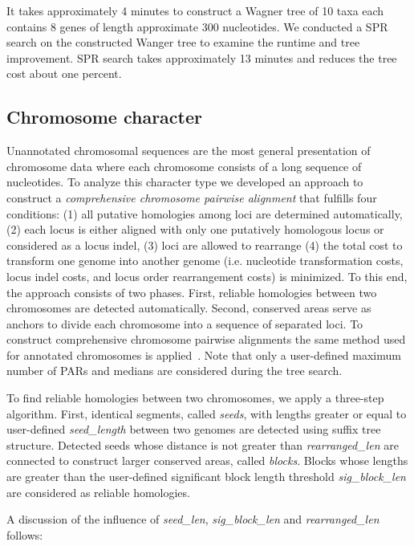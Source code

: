 It takes approximately 4 minutes to construct a Wagner tree of 10 taxa each contains
8 genes of length approximate 300 nucleotides. We conducted a 
SPR search on the constructed Wanger tree to examine the runtime and tree
improvement. SPR search takes approximately 13 minutes and reduces 
the tree cost about one percent.



\subsection{Chromosome character}

Unannotated chromosomal sequences are the most general presentation of
chromosome data where each chromosome consists of a long sequence of nucleotides.
To analyze this character type we developed an approach to construct a \emph{comprehensive chromosome pairwise
 alignment} that fulfills four conditions:
(1) all putative homologies among loci are determined automatically, 
(2) each locus is either aligned with only one putatively homologous locus or
considered as a locus indel, 
(3) loci are allowed to rearrange
(4) the total cost to transform one genome into another genome
(i.e. nucleotide transformation costs, locus indel costs, 
and locus order rearrangement costs) is minimized.  To this end, 
the approach consists of two phases. First, reliable homologies 
between two chromosomes are detected automatically. Second,
conserved areas serve as anchors to divide each chromosome into 
a sequence of separated loci.  To construct comprehensive chromosome
pairwise alignments the same method used for annotated chromosomes is applied~\cite{vinh2007}. 
Note that only a user-defined maximum number of PARs and medians are considered
during the tree search.


To find reliable homologies between two chromosomes, we apply a three-step algorithm.
First, identical segments, called \emph{seeds}, with lengths greater or equal to
user-defined \emph{seed\_length} between two genomes are detected using suffix tree
structure. Detected seeds whose distance is not greater than
\emph{rearranged\_len} are connected to construct larger conserved areas, called
\emph{blocks}. Blocks whose lengths are greater than the user-defined significant block length 
threshold \emph{sig\_block\_len} are considered as reliable homologies. 

A discussion of the influence of \emph{seed\_len},
\emph{sig\_block\_len} and \emph{rearranged\_len} follows:

